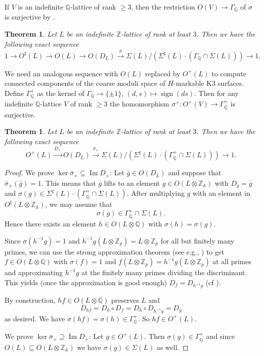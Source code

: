 \documentclass[a4paper]{amsart}
\theoremstyle{definition}
\theoremstyle{plain}
\newtheorem{theorem}[definition]{Theorem}
\DeclareMathOperator{\sign}{sign}
\newcommand{\QQ}{\mathbb{Q}}
\newcommand{\ZZ}{\mathbb{Z}}
\renewcommand{\AA}{\mathbb{A}}
\newcommand{\im}{\operatorname{Im}}
\begin{document}
If $V$ is an indefinite $\QQ$-lattice of rank $\geq 3$, then the restriction $O(V) \to \Gamma_{\QQ}$ of $\sigma$ is surjective by \cite[VIII 3.1]{miranda-morrison}.

\begin{theorem}\cite[VIII 5.1]{miranda-morrison}\label{thm:miranda-morrison}
Let $L$ be an indefinite $\ZZ$-lattice of rank at least $3$. Then we have the following exact sequence
\[1 \to O^\sharp(L) \to O(L) \to O(D_L) \xrightarrow{\bar \sigma} \Sigma(L)/(\Sigma^\sharp(L)\cdot (\Gamma_\QQ \cap \Sigma(L))) \to 1. \]
\end{theorem}

We need an analogous sequence with $O(L)$ replaced by $O^+(L)$ to compute connected components of the coarse moduli space of $H$-markable K3 surfaces.
Define $\Gamma_\QQ^+$ as the kernel of $\Gamma_\QQ \to \{\pm 1\}$, $(d,s) \mapsto \sign(ds)$. Then for any indefinite $\QQ$-lattice $V$ of rank $\geq 3$ the homomorphism $\sigma^+\colon O^+(V) \to \Gamma_\QQ^+$ is surjective.

%
\begin{theorem}\label{thm:miranda-morrison-signed}
 Let $L$ be an indefinite $\ZZ$-lattice of rank at least $3$. Then we have the following exact sequence
\[O^+(L) \xrightarrow{D_+} O(D_L) \xrightarrow{\bar \sigma_+} \Sigma(L)/(\Sigma^\sharp(L)\cdot (\Gamma_\QQ^+ \cap \Sigma(L))) \to 1. \]
 \end{theorem}
 \begin{proof}
We prove $\ker \bar\sigma_+ \subseteq \im D_+$:
Let $\bar g \in O(D_L)$ and suppose that $\bar\sigma_+(\bar g) = 1$.
This means that $\bar g$ lifts to an element $g \in O(L\otimes \ZZ_\AA)$ with $D_g=\bar g$ and
$\sigma(g)\in \Sigma^\sharp(L)\cdot (\Gamma_\QQ^+ \cap \Sigma(L))$.
After multiplying $g$ with an element in $O^\sharp(L\otimes \ZZ_\AA)$, we may assume that
\[\sigma(g) \in \Gamma_\QQ^+ \cap \Sigma(L).\]
Hence there exists an element $h \in O(L\otimes \QQ)$ with $\sigma(h)=\sigma(g)$.

Since $\sigma(h^{-1}g)=1$ and $h^{-1}g(L\otimes \ZZ_p)=L \otimes \ZZ_p$ for all but finitely many primes, we can use the strong approximation theorem (see e.g.\cite[5.1.3]{KirschmerHabil}, \cite{kneser1966}) to get $f \in O(L\otimes \QQ)$ with $\sigma(f)=1$ and $f(L \otimes {\ZZ_p}) = h^{-1}g(L \otimes {\ZZ_p})$ at all primes and approximating $h^{-1}g$ at the finitely many primes dividing the discriminant. This yields (once the approximation is good enough) $D_f = D_{h^{-1}g}$ (cf \cite[VIII 2.2]{miranda-morrison}).

By construction, $h f \in O(L \otimes \QQ)$ preserves $L$
and \[D_{hf} = D_{h} \circ D_f = D_{h} \circ D_{h^{-1}g} = D_g\]
as desired.
We have $\sigma(hf) = \sigma(h)  \in \Gamma_\QQ^+$. So $hf \in O^+(L)$.

We prove $\ker \bar \sigma_+ \supseteq \im D_+$: Let $ g \in O^+(L)$. Then $\sigma(g) \in \Gamma^+_\QQ$ and since $O(L) \subseteq O(L\otimes \ZZ_\AA)$ we have $\sigma(g) \in \Sigma(L)$ as well.
 \end{proof}
\end{document}
